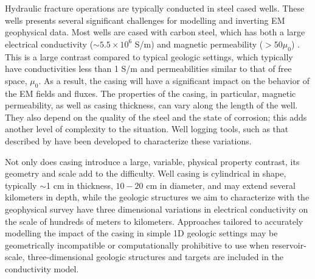 Hydraulic fracture operations are typically conducted in steel cased wells. These wells presents several significant challenges for modelling and inverting EM geophysical data. Most wells are cased with carbon steel, which has both a large electrical conductivity ($\sim 5.5\times 10^6$ S/m) and magnetic permeability ($> 50 \mu_0$) \citep{wuhabashy1994}. This is a large contrast compared to  typical geologic settings, which typically have conductivities less than 1 S/m and permeabilities similar to that of free space, $\mu_0$. As a result, the casing will have a significant impact on the behavior of the EM fields and fluxes. The properties of the casing, in particular, magnetic permeability, as well as casing thickness, can vary along the length of the well. They also  depend on the quality of the steel and the state of corrosion; this adds another level of complexity to the situation. Well logging tools, such as that described by \cite{brill2012} have been developed to characterize these variations.

Not only does casing introduce a large, variable, physical property contrast, its geometry and scale add to the difficulty. Well casing is cylindrical in shape, typically $\sim$1 cm in thickness, $10-20$ cm in diameter, and may extend several kilometers in depth, while the geologic structures we aim to characterize with the geophysical survey have three dimensional variations in electrical conductivity on the scale of hundreds of meters to kilometers. Approaches tailored to accurately modelling the impact of the casing in simple 1D geologic settings may be geometrically incompatible or computationally prohibitive to use when reservoir-scale, three-dimensional geologic structures and targets are included in the conductivity model.

